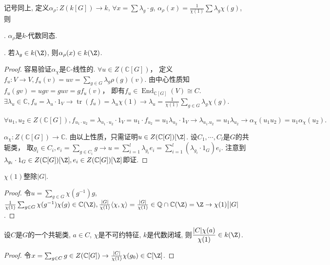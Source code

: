 \begin{proposition}
    记号同上, 定义$\alpha_\rho:Z(k[G])\rightarrow k$, 
    $\forall x=\sum \lambda_g\cdot g$, 
    $\alpha_\rho(x)=\frac{1}{\chi(1)}\sum \lambda_g\chi(g)$, 则\par
    . $\alpha_\rho$是$k$-代数同态.\par
    . 若$\lambda_g\in k(\Z)$, 则$\alpha_\rho(x)\in k(\Z)$.

\end{proposition}
\begin{proof}
	容易验证$ \alpha_{\chi} $是$\mathbb C$-线性的.
	$\forall u\in  Z(\mathbb C[G])$，
    定义$f_u:V\rightarrow V,f_u(v)=uv=\sum_{g\in G} \lambda_g \rho (g)(v) $.
    由中心性质知$f_u(gv)=ugv=guv=gf_u(v)$，
    即有$f_u\in \operatorname{End}_{\mathbb C[G]}(V)\cong C$.
    $\exists \lambda_u \in \mathbb C,f_u=\lambda_u\cdot 1_V
    \rightarrow \operatorname{tr}(f_u)=\lambda_u\chi(1)\rightarrow \lambda _u
    =\frac{1}{\chi(1)}\sum_{g\in G} \lambda_g\chi(g).$
	
    $\forall u_1,u_2\in  Z(\mathbb C[G]),f_{u_1\cdot u_2}
    =\lambda_{u_1\cdot u_2}\cdot 1_V=u_1\cdot f_{u_2}
    =u_1\lambda_{u_2}\cdot 1_V\rightarrow\lambda_{u_1.u_2}=u_1\lambda_{u_2}
    \rightarrow \alpha_{\chi}(u_1u_2)=u_1\alpha_{\chi}(u_2).$

    $\alpha_{\chi}: Z(\mathbb C[G])\rightarrow \mathbb C$.
    由以上性质，只需证明$u\in  Z(\mathbb C[G])[\Z]$.
    设$C_1,\cdots,C_l$是$G$的共轭类，
    取$g_i\in C_i,e_i=\sum_{g\in C_i}g
    \rightarrow u=\sum_{i=1}^{l}\lambda_{g_i}e_i
    =\sum_{i=1}^{l}(\lambda_{g_i}\cdot1_G)e_i$.
    注意到$\lambda_{g_i}\cdot1_G\in  Z(\mathbb C[G])[\Z],
    e_i\in Z(\mathbb C[G])[\Z]$即证.
\end{proof}
\begin{corollary}
    $\chi(1)$整除$|G|$.
\end{corollary}
	\begin{proof}
		令$u=\sum_{g\in G} \chi (g^{-1})g$,
        $\frac{1}{\chi (1)}\sum_{g\in G} \chi (g^{-1}) \chi (g)\in \mathbb C(\Z),
        \frac{|G|}{\chi(1)}\langle \chi,\chi  \rangle=\frac{|G|}{\chi(1)}
        \in \mathbb Q\cap\mathbb C(\Z)=\Z\rightarrow\chi(1) \big| |G|$.
	\end{proof}
\begin{proposition}
    设$C$是$G$的一个共轭类, $a\in C$, $\chi$是不可约特征, $k$是代数闭域, 
    则$\dfrac{|C|\chi(a)}{\chi(1)}\in k(\Z)$.
\end{proposition}
\begin{proof}
	令$x=\sum_{g\in C}g\in Z(\mathbb C [G])
    \rightarrow\frac{|C|}{\chi(1)}\chi (g_0)\in \mathbb C[\Z]$.
\end{proof}
